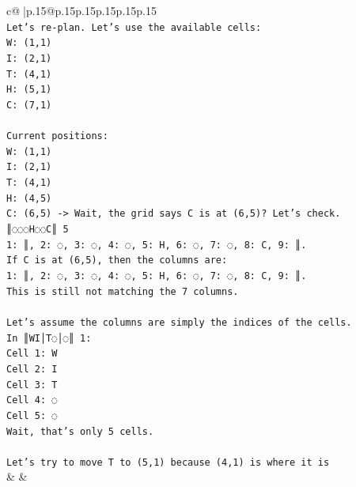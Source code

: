 \documentclass{article}
\begin{document}
{\begin{supertabular}{c@{$\;$}|p{.15\linewidth}@{}p{.15\linewidth}p{.15\linewidth}p{.15\linewidth}p{.15\linewidth}p{.15\linewidth}}
{{{\\ 
\texttt{Let's re{-}plan. Let's use the available cells:} \\
\texttt{W: (1,1)} \\
\texttt{I: (2,1)} \\
\texttt{T: (4,1)} \\
\texttt{H: (5,1)} \\
\texttt{C: (7,1)} \\
\\ 
\texttt{Current positions:} \\
\texttt{W: (1,1)} \\
\texttt{I: (2,1)} \\
\texttt{T: (4,1)} \\
\texttt{H: (4,5)} \\
\texttt{C: (6,5) {-}> Wait, the grid says C is at (6,5)? Let's check.} \\
\texttt{║◌◌◌H◌◌C║ 5} \\
\texttt{1: ║, 2: ◌, 3: ◌, 4: ◌, 5: H, 6: ◌, 7: ◌, 8: C, 9: ║.} \\
\texttt{If C is at (6,5), then the columns are:} \\
\texttt{1: ║, 2: ◌, 3: ◌, 4: ◌, 5: H, 6: ◌, 7: ◌, 8: C, 9: ║.} \\
\texttt{This is still not matching the 7 columns.} \\
\\ 
\texttt{Let's assume the columns are simply the indices of the cells.} \\
\texttt{In ║WI│T◌│◌║ 1:} \\
\texttt{Cell 1: W} \\
\texttt{Cell 2: I} \\
\texttt{Cell 3: T} \\
\texttt{Cell 4: ◌} \\
\texttt{Cell 5: ◌} \\
\texttt{Wait, that's only 5 cells.} \\
\\ 
\texttt{Let's try to move T to (5,1) because (4,1) is where it is} \\
            }
        }
    }
    & & \\ \\


\end{supertabular}}
\end{document}
